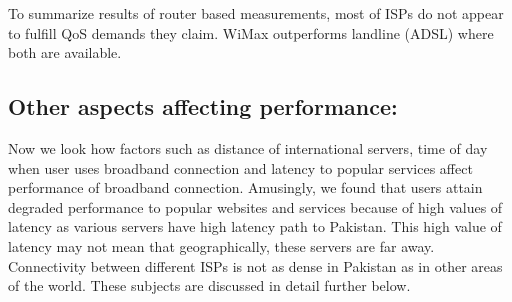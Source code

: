 \documentclass{sig-alternate-10pt}
\begin{document}

\indent To summarize results of router based measurements, most of ISPs do not appear to fulfill QoS demands they claim. WiMax outperforms landline (ADSL) where both are available.

\subsection {Other aspects affecting performance:}
Now we look how factors such as distance of international servers, time of day when user uses broadband connection and latency to popular services affect   performance of broadband connection. Amusingly, we found that users attain degraded performance to popular websites and services because of high values of latency as various servers have high latency path to Pakistan. This high value of latency may not mean that geographically, these servers are far away. Connectivity between different ISPs is not as dense in Pakistan as in other areas of the world. These subjects are discussed in detail further below.
\end{document}
